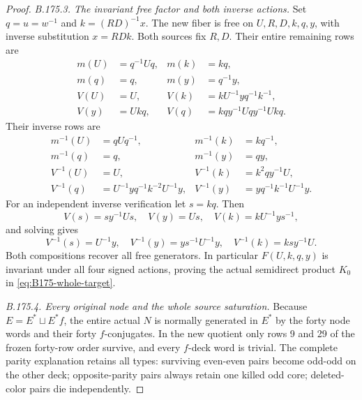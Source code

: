 \begin{proof}
\emph{B.175.3. The invariant free factor and both inverse actions.}
Set \(q=u=w^{-1}\) and \(k=(RD)^{-1}x\). The new fiber is free on
\(U,R,D,k,q,y\), with inverse substitution \(x=RDk\).
Both sources fix \(R,D\). Their entire remaining rows are
\begin{equation}\label{eq:B175-positive-actions}
\begin{aligned}
 m(U)&=q^{-1}Uq,&m(k)&=kq,\\
 m(q)&=q,&m(y)&=q^{-1}y,\\
 V(U)&=U,&V(k)&=kU^{-1}yq^{-1}k^{-1},\\
 V(y)&=Ukq,&V(q)&=kq y^{-1}Uq y^{-1}Ukq.
\end{aligned}
\end{equation}
Their inverse rows are
\begin{equation}\label{eq:B175-negative-actions}
\begin{aligned}
 m^{-1}(U)&=qUq^{-1},&m^{-1}(k)&=kq^{-1},\\
 m^{-1}(q)&=q,&m^{-1}(y)&=qy,\\
 V^{-1}(U)&=U,&V^{-1}(k)&=k^2q y^{-1}U,\\
 V^{-1}(q)&=U^{-1}yq^{-1}k^{-2}U^{-1}y,
       &V^{-1}(y)&=yq^{-1}k^{-1}U^{-1}y.
\end{aligned}
\end{equation}
For an independent inverse verification let \(s=kq\). Then
\[
 V(s)=sy^{-1}Us,\quad V(y)=Us,\quad V(k)=kU^{-1}ys^{-1},
\]
and solving gives
\[
 V^{-1}(s)=U^{-1}y,\quad V^{-1}(y)=ys^{-1}U^{-1}y,
 \quad V^{-1}(k)=ksy^{-1}U.
\]
Both compositions recover all free generators. In particular
\(F(U,k,q,y)\) is invariant under all four signed actions, proving the
actual semidirect product \(K_0\) in \eqref{eq:B175-whole-target}.

\emph{B.175.4. Every original node and the whole source saturation.}
Because \(E=E^*\sqcup E^*f\), the entire actual \(N\) is normally
generated in \(E^*\) by the forty node words and their forty
\(f\)-conjugates. In the new quotient only rows 9 and 29 of the frozen
forty-row order survive, and every \(f\)-deck word is trivial.
The complete parity explanation retains all types: surviving even-even
pairs become odd-odd on the other deck; opposite-parity pairs always
retain one killed odd core; deleted-color pairs die independently.


\end{proof}

